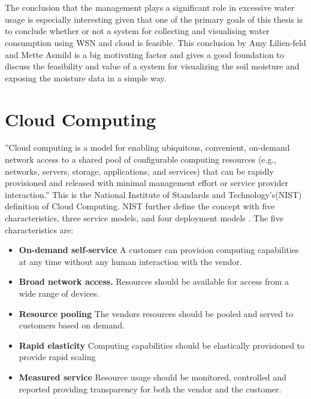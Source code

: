 \documentclass[]{uiophd}
\begin{document}
\\\\
The conclusion that the management plays a significant role in excessive water usage is especially interesting given that one of the primary goals of this thesis is to conclude whether or not a system for collecting and visualising water consumption using WSN and cloud is feasible. This conclusion by Amy Lilien-feld and Mette Asmild is a big motivating factor and gives a good foundation to discuss the feasibility and value of a system for visualizing the soil moisture and exposing the moisture data in a simple way.

\section{Cloud Computing}
''Cloud computing is a model for enabling ubiquitous, convenient, on-demand network access to a shared pool of configurable computing resources (e.g., networks, servers, storage, applications, and services) that can be rapidly provisioned and released with minimal management effort or service provider interaction.''\cite{Mell:2011:SND:2206223} This is the National Institute of Standards and Technology's(NIST) definition of Cloud Computing. NIST further define the concept with five characteristics, three service models, and four deployment models \cite{Mell:2011:SND:2206223}. The five characteristics are:
\begin{itemize}
\item \textbf{On-demand self-service} A customer can provision computing capabilities at any time without any human interaction with the vendor.
\item \textbf{Broad network access.} Resources should be available for access from a wide range of devices.
\item \textbf{Resource pooling} The vendors resources should be pooled and served to customers based on demand.
\item \textbf{Rapid elasticity} Computing capabilities should be elastically provisioned to provide rapid scaling 
\item \textbf{Measured service} Resource usage should be monitored, controlled and reported providing transparency for both the vendor and the customer.
\end{itemize}
\end{document}
